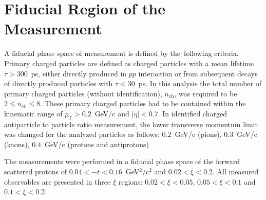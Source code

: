 \section{Fiducial Region of the Measurement}\label{section:star_fiducial}
A fiducial phase space of measurement  is defined by the~following criteria. Primary charged particles are defined as charged particles with a mean lifetime $\tau >300$~ps, either directly produced in $pp$ interaction or from subsequent decays of directly produced particles with $\tau <30$~ps. In this analysis the total number of primary charged particles (without identification), $n_\textrm{ch}$, was required to be  $2\leq n_\textrm{ch} \leq 8$. These primary charged particles had to be contained within the kinematic range of $p_\textrm{T}>0.2$~GeV/c and $|\eta|<0.7$. In identified charged antiparticle to particle ratio measurement, the lower transverse momentum limit was changed for the analyzed particles as follows: $0.2$~GeV/c (pions), $0.3$~GeV/c (kaons), $0.4$~GeV/c (protons and antiprotons)

The measurements were performed in a fiducial phase space of the forward scattered protons of $0.04<-t<0.16$~GeV$^{2}$/c$^2$ and $0.02 < \xi<0.2$. All measured observables are presented in three $\xi$ regions: $0.02<\xi<0.05$, $0.05<\xi<0.1$ and $0.1<\xi<0.2$.
\FloatBarrier